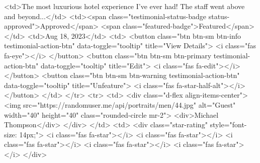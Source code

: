                                                 <td>The most luxurious hotel experience I've ever had! The staff went above and beyond...</td>
                                                <td><span class="testimonial-status-badge status-approved">Approved</span> <span class="featured-badge">Featured</span></td>
                                                <td>Aug 18, 2023</td>
                                                <td>
                                                    <button class="btn btn-sm btn-info testimonial-action-btn" data-toggle="tooltip" title="View Details">
                                                        <i class="fas fa-eye"></i>
                                                    </button>
                                                    <button class="btn btn-sm btn-primary testimonial-action-btn" data-toggle="tooltip" title="Edit">
                                                        <i class="fas fa-edit"></i>
                                                    </button>
                                                    <button class="btn btn-sm btn-warning testimonial-action-btn" data-toggle="tooltip" title="Unfeature">
                                                        <i class="fas fa-star-half-alt"></i>
                                                    </button>
                                                </td>
                                            </tr>
                                            <tr>
                                                <td>
                                                    <div class="d-flex align-items-center">
                                                        <img src="https://randomuser.me/api/portraits/men/44.jpg" alt="Guest" width="40" height="40" class="rounded-circle mr-2">
                                                        <div>Michael Thompson</div>
                                                    </div>
                                                </td>
                                                <td>
                                                    <div class="star-rating" style="font-size: 14px;">
                                                        <i class="fas fa-star"></i>
                                                        <i class="fas fa-star"></i>
                                                        <i class="fas fa-star"></i>
                                                        <i class="fas fa-star"></i>
                                                        <i class="fas fa-star"></i>
                                                    </div>
